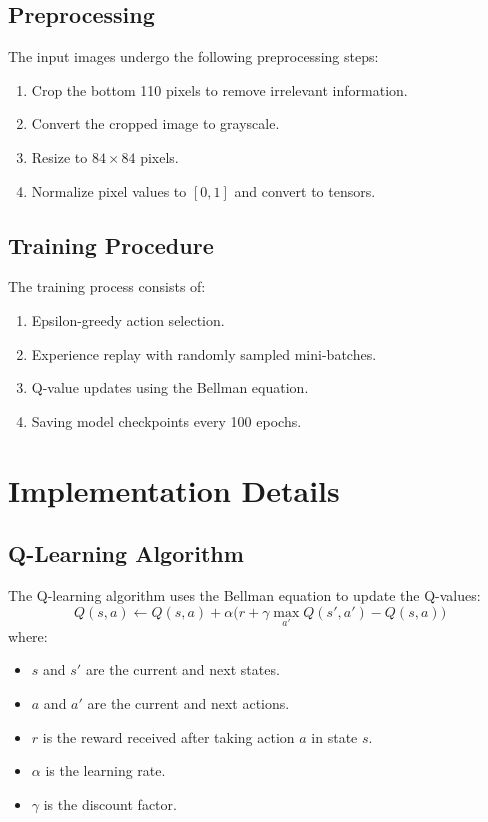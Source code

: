 \documentclass[a4paper,12pt]{article}
\begin{document}
\subsection{Preprocessing}
The input images undergo the following preprocessing steps:
\begin{enumerate}
    \item Crop the bottom 110 pixels to remove irrelevant information.
    \item Convert the cropped image to grayscale.
    \item Resize to \(84 \times 84\) pixels.
    \item Normalize pixel values to \([0, 1]\) and convert to tensors.
\end{enumerate}

\subsection{Training Procedure}
The training process consists of:
\begin{enumerate}
    \item Epsilon-greedy action selection.
    \item Experience replay with randomly sampled mini-batches.
    \item Q-value updates using the Bellman equation.
    \item Saving model checkpoints every 100 epochs.
\end{enumerate}

\section{Implementation Details}
\subsection{Q-Learning Algorithm}
The Q-learning algorithm uses the Bellman equation to update the Q-values:
\[
Q(s, a) \leftarrow Q(s, a) + \alpha \Big( r + \gamma \max_{a'} Q(s', a') - Q(s, a) \Big)
\]
where:
\begin{itemize}
    \item \(s\) and \(s'\) are the current and next states.
    \item \(a\) and \(a'\) are the current and next actions.
    \item \(r\) is the reward received after taking action \(a\) in state \(s\).
    \item \(\alpha\) is the learning rate.
    \item \(\gamma\) is the discount factor.
\end{itemize}
\end{document}
